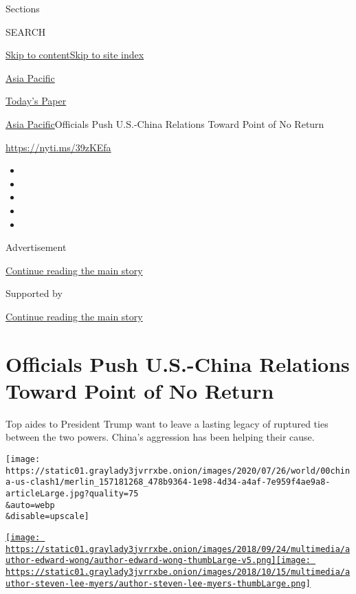 Sections

SEARCH

\protect\hyperlink{site-content}{Skip to
content}\protect\hyperlink{site-index}{Skip to site index}

\href{https://www.nytimes3xbfgragh.onion/section/world/asia}{Asia
Pacific}

\href{https://myaccount.nytimes3xbfgragh.onion/auth/login?response_type=cookie\&client_id=vi}{}

\href{https://www.nytimes3xbfgragh.onion/section/todayspaper}{Today's
Paper}

\href{/section/world/asia}{Asia Pacific}\textbar{}Officials Push
U.S.-China Relations Toward Point of No Return

\href{https://nyti.ms/39zKEfa}{https://nyti.ms/39zKEfa}

\begin{itemize}
\item
\item
\item
\item
\item
\end{itemize}

Advertisement

\protect\hyperlink{after-top}{Continue reading the main story}

Supported by

\protect\hyperlink{after-sponsor}{Continue reading the main story}

\hypertarget{officials-push-us-china-relations-toward-point-of-no-return}{%
\section{Officials Push U.S.-China Relations Toward Point of No
Return}\label{officials-push-us-china-relations-toward-point-of-no-return}}

Top aides to President Trump want to leave a lasting legacy of ruptured
ties between the two powers. China's aggression has been helping their
cause.

\texttt{[image: https://static01.graylady3jvrrxbe.onion/images/2020/07/26/world/00china-us-clash1/merlin\_157181268\_478b9364-1e98-4d34-a4af-7e959f4ae9a8-articleLarge.jpg?quality=75\\\&auto=webp\\\&disable=upscale]}

\href{https://www.nytimes3xbfgragh.onion/by/edward-wong}{\texttt{[image: https://static01.graylady3jvrrxbe.onion/images/2018/09/24/multimedia/author-edward-wong/author-edward-wong-thumbLarge-v5.png]}}\href{https://www.nytimes3xbfgragh.onion/by/steven-lee-myers}{\texttt{[image: https://static01.graylady3jvrrxbe.onion/images/2018/10/15/multimedia/author-steven-lee-myers/author-steven-lee-myers-thumbLarge.png]}}

